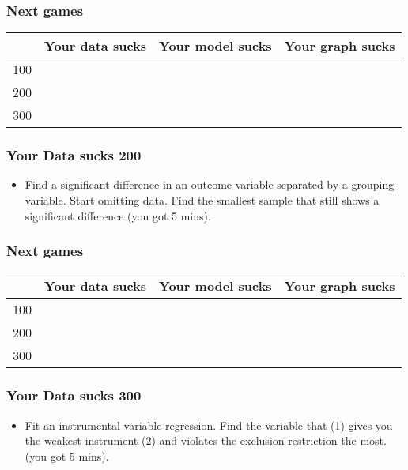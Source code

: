 \documentclass[xcolor=table,dvipsnames]{beamer}
\begin{document}
\begin{frame}
\frametitle{Next games}
\begin{table}[H]\centering
{\color{white} \begin{tabular}{|r|c|c|c|} \hline
\rowcolor{jeopardy} & Your data sucks & Your model sucks & Your graph sucks \\\hline
\rowcolor{jeopardy} 100 & & & \\\hline
\rowcolor{jeopardy} 200 & & & \\\hline
\rowcolor{jeopardy} 300 & &	& \\\hline
\end{tabular}}
\end{table}

\end{frame}	


\begin{frame}
\frametitle{Your Data sucks 200}
\begin{itemize}	
\item[] Find a significant difference in an outcome variable separated by a grouping variable. Start omitting data. Find the smallest sample that still shows a significant difference (you got 5 mins).  
\end{itemize}
\end{frame}	

\begin{frame}
\frametitle{Next games}
\begin{table}[H]\centering
{\color{white} \begin{tabular}{|r|c|c|c|} \hline
\rowcolor{jeopardy} & Your data sucks & Your model sucks & Your graph sucks \\\hline
\rowcolor{jeopardy} 100 & & & \\\hline
\rowcolor{jeopardy} 200 & & & \\\hline
\rowcolor{jeopardy} 300 & &	& \\\hline
\end{tabular}}
\end{table}

\end{frame}	


\begin{frame}
\frametitle{Your Data sucks 300}
\begin{itemize}	
\item[] Fit an instrumental variable regression. Find the variable that (1) gives you the weakest instrument (2) and violates the exclusion restriction the most. (you got 5 mins).
\end{itemize}
\end{frame}	
\end{document}
